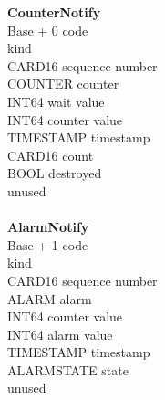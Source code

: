 \begin{tabbing}
\tabstopsC
{\bf CounterNotify}\\
		\> Base + 0	\> code \\
				\> kind \\
		\> CARD16	\> sequence number \\
		\> COUNTER	\> counter \\
		\> INT64	\> wait value \\
		\> INT64	\> counter value \\
		\> TIMESTAMP		\> timestamp \\
		\> CARD16	\> count \\
		\> BOOL		\> destroyed \\
		\> 		\> unused \\
\\
{\bf AlarmNotify}\\
		\> Base + 1	\> code \\
	\> 1			\> kind \\
		\> CARD16	\> sequence number \\
		\> ALARM	\> alarm \\
		\> INT64	\> counter value \\
		\> INT64	\> alarm value \\
		\> TIMESTAMP		\> timestamp \\
		\> ALARMSTATE	\> state \\
		\>		\> unused\\
\end{tabbing}

